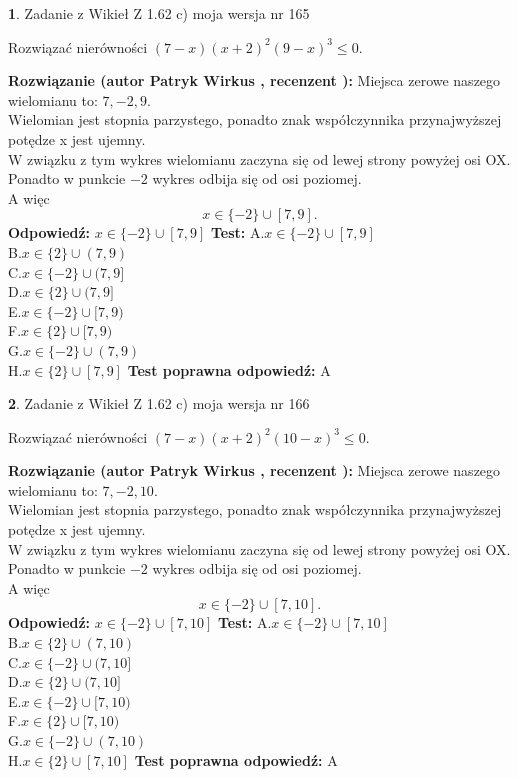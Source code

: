\documentclass[12pt, a4paper]{article}
\theoremstyle{definition} %
\newtheorem{zad}{}
\newcommand{\zadStart}[1]{\begin{zad}#1\newline}
\newcommand{\zadStop}{\end{zad}}
\newcommand{\rozwStart}[2]{\noindent \textbf{Rozwiązanie (autor #1 , recenzent #2): }\newline}
\newcommand{\rozwStop}{\newline}
\newcommand{\odpStart}{\noindent \textbf{Odpowiedź:}\newline}
\newcommand{\odpStop}{\newline}
\newcommand{\testStart}{\noindent \textbf{Test:}\newline}
\newcommand{\testStop}{\newline}
\newcommand{\kluczStart}{\noindent \textbf{Test poprawna odpowiedź:}\newline}
\newcommand{\kluczStop}{\newline}
\begin{document}
\zadStart{Zadanie z Wikieł Z 1.62 c) moja wersja nr 165}

Rozwiązać nierówności $(7-x)(x+2)^{2}(9-x)^{3}\le0$.
\zadStop
\rozwStart{Patryk Wirkus}{}
Miejsca zerowe naszego wielomianu to: $7, -2, 9$.\\
Wielomian jest stopnia parzystego, ponadto znak współczynnika przy\linebreak najwyższej potędze x jest ujemny.\\ W związku z tym wykres wielomianu zaczyna się od lewej strony powyżej osi OX.\\
Ponadto w punkcie $-2$ wykres odbija się od osi poziomej.\\
A więc $$x \in \{-2\} \cup [7,9].$$
\rozwStop
\odpStart
$x \in \{-2\} \cup [7,9]$
\odpStop
\testStart
A.$x \in \{-2\} \cup [7,9]$\\
B.$x \in \{2\} \cup (7,9)$\\
C.$x \in \{-2\} \cup (7,9]$\\
D.$x \in \{2\} \cup (7,9]$\\
E.$x \in \{-2\} \cup [7,9)$\\
F.$x \in \{2\} \cup [7,9)$\\
G.$x \in \{-2\} \cup (7,9)$\\
H.$x \in \{2\} \cup [7,9]$
\testStop
\kluczStart
A
\kluczStop



\zadStart{Zadanie z Wikieł Z 1.62 c) moja wersja nr 166}

Rozwiązać nierówności $(7-x)(x+2)^{2}(10-x)^{3}\le0$.
\zadStop
\rozwStart{Patryk Wirkus}{}
Miejsca zerowe naszego wielomianu to: $7, -2, 10$.\\
Wielomian jest stopnia parzystego, ponadto znak współczynnika przy\linebreak najwyższej potędze x jest ujemny.\\ W związku z tym wykres wielomianu zaczyna się od lewej strony powyżej osi OX.\\
Ponadto w punkcie $-2$ wykres odbija się od osi poziomej.\\
A więc $$x \in \{-2\} \cup [7,10].$$
\rozwStop
\odpStart
$x \in \{-2\} \cup [7,10]$
\odpStop
\testStart
A.$x \in \{-2\} \cup [7,10]$\\
B.$x \in \{2\} \cup (7,10)$\\
C.$x \in \{-2\} \cup (7,10]$\\
D.$x \in \{2\} \cup (7,10]$\\
E.$x \in \{-2\} \cup [7,10)$\\
F.$x \in \{2\} \cup [7,10)$\\
G.$x \in \{-2\} \cup (7,10)$\\
H.$x \in \{2\} \cup [7,10]$
\testStop
\kluczStart
A
\kluczStop
\end{document}
